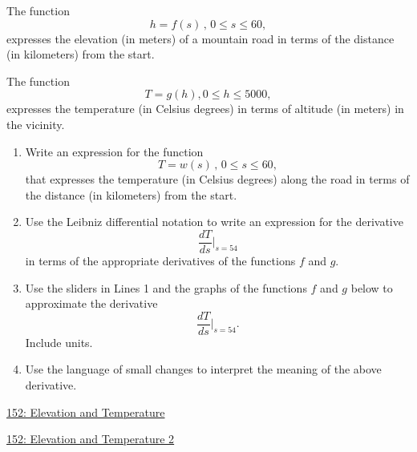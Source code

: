 \documentclass{ximera}
\begin{document}
\begin{question}  \label{Q9erKKe333}
The function
\[
   h = f(s) \, , \, 0\leq s \leq 60 ,
\]
expresses the elevation (in meters) of a mountain road in terms of the distance (in kilometers) from the start.

The function 
\[
    T = g(h) , 0\leq h \leq 5000 ,
\] 
expresses the temperature (in Celsius degrees) in terms of altitude (in meters) in the vicinity.

\begin{enumerate}
\item Write an expression for the function
\[
 T = w(s) \, , \, 0\leq s \leq 60 ,
\]
that expresses the temperature (in Celsius degrees) along the road in terms of the distance (in kilometers) from the start.

\item Use the Leibniz differential notation to write an expression for the derivative
\[
  \frac{dT}{ds}\Big|_{s=54}
\]
in terms of the appropriate derivatives of the functions $f$ and $g$.

\item Use the sliders in Lines 1 and the graphs of the functions $f$ and $g$ below to approximate the derivative
\[
   \frac{dT}{ds}\Big|_{s=54} .
\]
Include units.

\item Use the language of small changes to interpret the meaning of the above derivative.
\end{enumerate}

\begin{onlineOnly}
    \begin{center}
\end{center}
\end{onlineOnly}

\href{https://www.desmos.com/calculator/gcmfa2a6jz}{152: Elevation and Temperature}

\begin{onlineOnly}
    \begin{center}
\end{center}
\end{onlineOnly}

\href{https://www.desmos.com/calculator/ohqk3ak539}{152: Elevation and Temperature 2}
\end{question}
\end{document}
